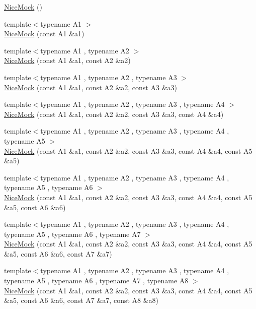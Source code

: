 \begin{DoxyCompactItemize}
\item 
\hyperlink{classtesting_1_1_nice_mock_a10bbd6ebe779ac8ab1f9f3ae2dee9310}{Nice\+Mock} ()
\item 
{\footnotesize template$<$typename A1 $>$ }\\\hyperlink{classtesting_1_1_nice_mock_a2d6b9cb9d929d1af4532b69c7ef19df6}{Nice\+Mock} (const A1 \&a1)
\item 
{\footnotesize template$<$typename A1 , typename A2 $>$ }\\\hyperlink{classtesting_1_1_nice_mock_a150837476e88f52772c8f85180b889a1}{Nice\+Mock} (const A1 \&a1, const A2 \&a2)
\item 
{\footnotesize template$<$typename A1 , typename A2 , typename A3 $>$ }\\\hyperlink{classtesting_1_1_nice_mock_a0b91bd74b497626bb81d07c3d4b59d22}{Nice\+Mock} (const A1 \&a1, const A2 \&a2, const A3 \&a3)
\item 
{\footnotesize template$<$typename A1 , typename A2 , typename A3 , typename A4 $>$ }\\\hyperlink{classtesting_1_1_nice_mock_a5ffbe1a648f16612266d4e67a2d063d1}{Nice\+Mock} (const A1 \&a1, const A2 \&a2, const A3 \&a3, const A4 \&a4)
\item 
{\footnotesize template$<$typename A1 , typename A2 , typename A3 , typename A4 , typename A5 $>$ }\\\hyperlink{classtesting_1_1_nice_mock_a3812c0ba0d743f9a0c3d276dfc076f4c}{Nice\+Mock} (const A1 \&a1, const A2 \&a2, const A3 \&a3, const A4 \&a4, const A5 \&a5)
\item 
{\footnotesize template$<$typename A1 , typename A2 , typename A3 , typename A4 , typename A5 , typename A6 $>$ }\\\hyperlink{classtesting_1_1_nice_mock_a156d0fce85ac08abffdf4aa0c3975f81}{Nice\+Mock} (const A1 \&a1, const A2 \&a2, const A3 \&a3, const A4 \&a4, const A5 \&a5, const A6 \&a6)
\item 
{\footnotesize template$<$typename A1 , typename A2 , typename A3 , typename A4 , typename A5 , typename A6 , typename A7 $>$ }\\\hyperlink{classtesting_1_1_nice_mock_a946d75ece1fa3a066b7d9d6ab7828c55}{Nice\+Mock} (const A1 \&a1, const A2 \&a2, const A3 \&a3, const A4 \&a4, const A5 \&a5, const A6 \&a6, const A7 \&a7)
\item 
{\footnotesize template$<$typename A1 , typename A2 , typename A3 , typename A4 , typename A5 , typename A6 , typename A7 , typename A8 $>$ }\\\hyperlink{classtesting_1_1_nice_mock_ae8792aab6c024a50886856bf1093eedc}{Nice\+Mock} (const A1 \&a1, const A2 \&a2, const A3 \&a3, const A4 \&a4, const A5 \&a5, const A6 \&a6, const A7 \&a7, const A8 \&a8)

\end{DoxyCompactItemize}
